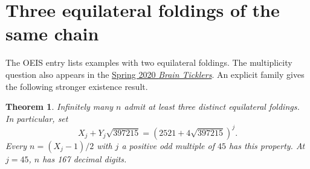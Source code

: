 \documentclass[11pt,letterpaper]{article}
\newtheorem{theorem}{Theorem}
\begin{document}
\section*{Three equilateral foldings of the same chain}
The OEIS entry lists examples with two equilateral foldings. The multiplicity question also appears in the \href{https://www.tbp.org/static/docs/brain-ticklers/Sp20.pdf}{Spring 2020 \emph{Brain Ticklers}}. An explicit family gives the following stronger existence result.

\begin{theorem}
Infinitely many $n$ admit at least three distinct equilateral foldings. In particular, set
\[
 X_j+Y_j\sqrt{397215}=(2521+4\sqrt{397215})^j .
\]
Every $n=(X_j-1)/2$ with $j$ a positive odd multiple of $45$ has this property. At $j=45$, $n$ has 167 decimal digits.
\end{theorem}
\end{document}
